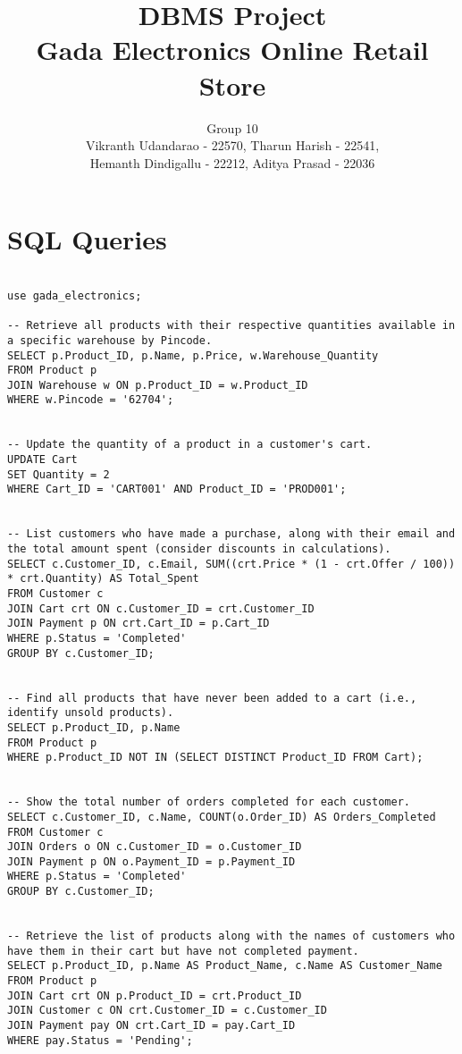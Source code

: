 \documentclass[12pt]{article}
\begin{document}
\title{\textbf{DBMS Project\\ Gada Electronics Online Retail Store}}
\author{Group 10 \\ Vikranth Udandarao - 22570, Tharun Harish - 22541, \\ Hemanth Dindigallu - 22212, Aditya Prasad - 22036}
\date{}
\maketitle

\section*{SQL Queries}

\begin{verbatim}

use gada_electronics;

-- Retrieve all products with their respective quantities available in a specific warehouse by Pincode.
SELECT p.Product_ID, p.Name, p.Price, w.Warehouse_Quantity
FROM Product p
JOIN Warehouse w ON p.Product_ID = w.Product_ID
WHERE w.Pincode = '62704';


-- Update the quantity of a product in a customer's cart.
UPDATE Cart
SET Quantity = 2
WHERE Cart_ID = 'CART001' AND Product_ID = 'PROD001';


-- List customers who have made a purchase, along with their email and the total amount spent (consider discounts in calculations).
SELECT c.Customer_ID, c.Email, SUM((crt.Price * (1 - crt.Offer / 100)) * crt.Quantity) AS Total_Spent
FROM Customer c
JOIN Cart crt ON c.Customer_ID = crt.Customer_ID
JOIN Payment p ON crt.Cart_ID = p.Cart_ID
WHERE p.Status = 'Completed'
GROUP BY c.Customer_ID;


-- Find all products that have never been added to a cart (i.e., identify unsold products).
SELECT p.Product_ID, p.Name
FROM Product p
WHERE p.Product_ID NOT IN (SELECT DISTINCT Product_ID FROM Cart);


-- Show the total number of orders completed for each customer.
SELECT c.Customer_ID, c.Name, COUNT(o.Order_ID) AS Orders_Completed
FROM Customer c
JOIN Orders o ON c.Customer_ID = o.Customer_ID
JOIN Payment p ON o.Payment_ID = p.Payment_ID
WHERE p.Status = 'Completed'
GROUP BY c.Customer_ID;


-- Retrieve the list of products along with the names of customers who have them in their cart but have not completed payment.
SELECT p.Product_ID, p.Name AS Product_Name, c.Name AS Customer_Name
FROM Product p
JOIN Cart crt ON p.Product_ID = crt.Product_ID
JOIN Customer c ON crt.Customer_ID = c.Customer_ID
JOIN Payment pay ON crt.Cart_ID = pay.Cart_ID
WHERE pay.Status = 'Pending';



\end{verbatim}
\end{document}
